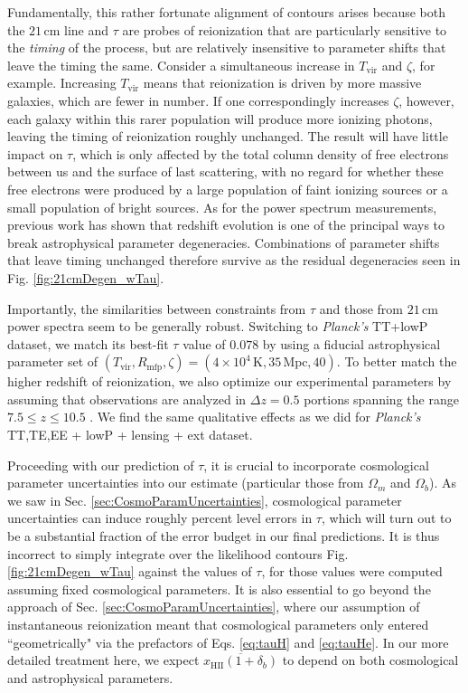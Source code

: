 \documentclass[twocolumn,aps,prd,nofootinbib,showpacs,superscriptaddress]{revtex4-1}
\begin{document}
Fundamentally, this rather fortunate alignment of contours arises because both the $21\,\textrm{cm}$ line and $\tau$ are probes of reionization that are particularly sensitive to the \emph{timing} of the process, but are relatively insensitive to parameter shifts that leave the timing the same. Consider a simultaneous increase in $T_\textrm{vir}$ and $\zeta$, for example. Increasing $T_\textrm{vir}$ means that reionization is driven by more massive galaxies, which are fewer in number. If one correspondingly increases $\zeta$, however, each galaxy within this rarer population will produce more ionizing photons, leaving the timing of reionization roughly unchanged. The result will have little impact on $\tau$, which is only affected by the total column density of free electrons between us and the surface of last scattering, with no regard for whether these free electrons were produced by a large population of faint ionizing sources or a small population of bright sources. As for the power spectrum measurements, previous work \cite{pober_et_al2014} has shown that redshift evolution is one of the principal ways to break astrophysical parameter degeneracies. Combinations of parameter shifts that leave timing unchanged therefore survive as the residual degeneracies seen in Fig. \ref{fig:21cmDegen_wTau}.

Importantly, the similarities between constraints from $\tau$ and those from $21\,\textrm{cm}$  power spectra seem to be generally robust. Switching to \emph{Planck's} TT+lowP dataset, we match its best-fit $\tau$ value of $0.078$ by using a fiducial astrophysical parameter set of $(T_\textrm{vir}, R_\textrm{mfp}, \zeta) = (4 \times 10^4\,\textrm{K}, 35\,\textrm{Mpc}, 40)$. To better match the higher redshift of reionization, we also optimize our experimental parameters by assuming that observations are analyzed in $\Delta z = 0.5$ portions spanning the range $7.5 \le z \le 10.5$ \cite{Liu_in_prep}. We find the same qualitative effects as we did for \emph{Planck's} TT,TE,EE + lowP + lensing + ext dataset.

Proceeding with our prediction of $\tau$, it is crucial to incorporate cosmological parameter uncertainties into our estimate (particular those from $\Omega_m$ and $\Omega_b$). As we saw in Sec. \ref{sec:CosmoParamUncertainties}, cosmological parameter uncertainties can induce roughly percent level errors in $\tau$, which will turn out to be a substantial fraction of the error budget in our final predictions. It is thus incorrect to simply integrate over the likelihood contours Fig. \ref{fig:21cmDegen_wTau} against the values of $\tau$, for those values were computed assuming fixed cosmological parameters. It is also essential to go beyond the approach of Sec. \ref{sec:CosmoParamUncertainties}, where our assumption of instantaneous reionization meant that cosmological parameters only entered ``geometrically" via the prefactors of Eqs. \eqref{eq:tauH} and \eqref{eq:tauHe}. In our more detailed treatment here, we expect $\overline{x_\textrm{HII} (1+\delta_b)}$ to depend on both cosmological and astrophysical parameters.
\end{document}
